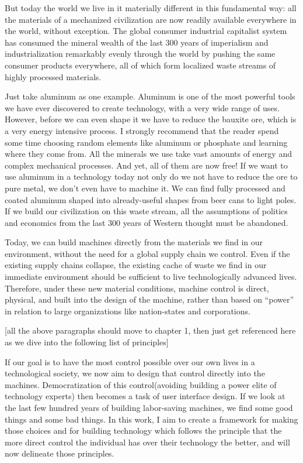But today the world we live in it materially different in this fundamental way: all the materials of a mechanized civilization are now readily available everywhere in the world, without exception.  The global consumer industrial capitalist system has consumed the mineral wealth of the last 300 years of imperialism and industrialization remarkably evenly through the world by pushing the same consumer products everywhere, all of which form localized waste streams of highly processed materials.  

Just take aluminum as one example.  Aluminum is one of the most powerful tools we have ever discovered to create technology, with a very wide range of uses.  However, before we can even shape it we have to reduce the bauxite ore, which is a very energy intensive process. I strongly recommend that the reader spend some time choosing random elements like aluminum or phosphate and learning where they come from.  All the minerals we use take vast amounts of energy and complex mechanical processes.  And yet, all of them are now free!  If we want to use aluminum in a technology today not only do we not have to reduce the ore to pure metal, we don't even have to machine it.  We can find fully processed and coated aluminum shaped into already-useful shapes from beer cans to light poles.  If we build our civilization on this waste stream, all the assumptions of politics and economics from the last 300 years of Western thought must be abandoned.  

Today, we can build machines directly from the materials we find in our environment, without the need for a global supply chain we control.  Even if the existing supply chains collapse, the existing cache of waste we find in our immediate environment should be sufficient to live technologically advanced lives.  Therefore, under these new material conditions, machine control is direct, physical, and built into the design of the machine, rather than based on ``power'' in relation to large organizations like nation-states and corporations.  

[all the above paragraphs should move to chapter 1, then just get referenced here as we dive into the following list of principles]

If our goal is to have the most control possible over our own lives in a technological society, we now aim to design that control directly into the machines. Democratization of this control(avoiding building a power elite of technology experts) then becomes a task of user interface design.  If we look at the last few hundred years of building labor-saving machines, we find some good things and some bad things.  In this work, I aim to create a framework for making those choices and for building technology which follows the principle that the more direct control the individual has over their technology the better, and will now delineate those principles.  

